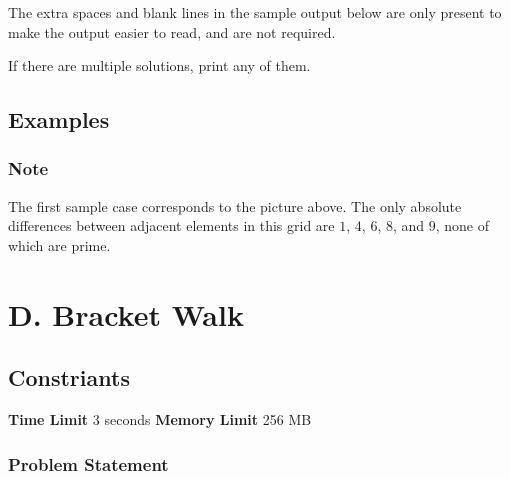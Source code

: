 \documentclass{article}
\begin{document}
The extra spaces and blank lines in the sample output below are only present to make the output easier to read, and are not required.

If there are multiple solutions, print any of them.
\subsection*{Examples}
\subsubsection*{Note}The first sample case corresponds to the picture above. The only absolute differences between adjacent elements in this grid are $1$, $4$, $6$, $8$, and $9$, none of which are prime.
\newpage
\section*{D. Bracket Walk}
\subsection*{Constriants}
\textbf{Time Limit}
3 seconds
\hfill
\textbf{Memory Limit}
256 MB
\subsubsection*{Problem Statement}
\end{document}
